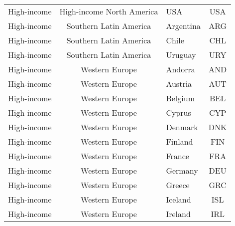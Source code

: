 \begin{landscape}
\begin{longtable}{|p{6cm}|c|p{5cm}|c|}
                                      High-income &    High-income North America &                                               USA &  USA \\
                                      High-income &       Southern Latin America &                                         Argentina &  ARG \\
                                      High-income &       Southern Latin America &                                             Chile &  CHL \\
                                      High-income &       Southern Latin America &                                           Uruguay &  URY \\
                                      High-income &               Western Europe &                                           Andorra &  AND \\
                                      High-income &               Western Europe &                                           Austria &  AUT \\
                                      High-income &               Western Europe &                                           Belgium &  BEL \\
                                      High-income &               Western Europe &                                            Cyprus &  CYP \\
                                      High-income &               Western Europe &                                           Denmark &  DNK \\
                                      High-income &               Western Europe &                                           Finland &  FIN \\
                                      High-income &               Western Europe &                                            France &  FRA \\
                                      High-income &               Western Europe &                                           Germany &  DEU \\
                                      High-income &               Western Europe &                                            Greece &  GRC \\
                                      High-income &               Western Europe &                                           Iceland &  ISL \\
                                      High-income &               Western Europe &                                           Ireland &  IRL \\

\end{longtable}
\end{landscape}
